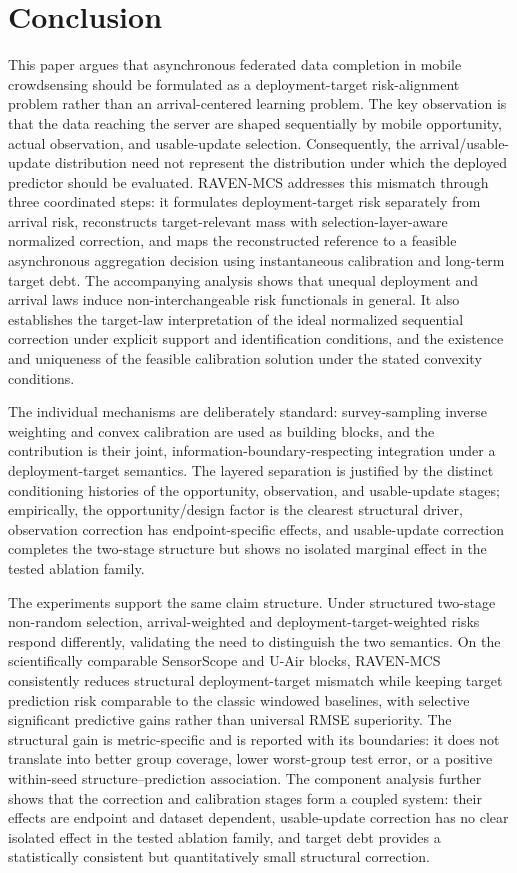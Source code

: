 \documentclass[letterpaper,journal]{IEEEtran}
\begin{document}
\section{Conclusion}
\label{sec:conclusion}

This paper argues that asynchronous federated data completion in mobile
crowdsensing should be formulated as a deployment-target risk-alignment
problem rather than an arrival-centered learning problem.  The key observation
is that the data reaching the server are shaped sequentially by mobile
opportunity, actual observation, and usable-update selection.  Consequently,
the arrival/usable-update distribution need not represent the distribution
under which the deployed predictor should be evaluated.  RAVEN-MCS addresses this
mismatch through three coordinated steps: it formulates deployment-target risk
separately from arrival risk, reconstructs target-relevant mass with
selection-layer-aware normalized correction, and maps the reconstructed
reference to a feasible asynchronous aggregation decision using instantaneous
calibration and long-term target debt.  The accompanying analysis shows that unequal deployment and arrival laws
induce non-interchangeable risk functionals in general.  It also establishes
the target-law interpretation of the ideal normalized sequential correction
under explicit support and identification conditions, and the existence and
uniqueness of the feasible calibration solution under the stated convexity
conditions.

The individual mechanisms are deliberately standard: survey-sampling inverse
weighting and convex calibration are used as building blocks, and the
contribution is their joint, information-boundary-respecting integration under
a deployment-target semantics.  The layered separation is justified by the
distinct conditioning histories of the opportunity, observation, and
usable-update stages; empirically, the opportunity/design factor is the
clearest structural driver, observation correction has endpoint-specific
effects, and usable-update correction completes the two-stage structure but
shows no isolated marginal effect in the tested ablation family.

The experiments support the same claim structure.  Under structured
two-stage non-random selection, arrival-weighted and deployment-target-weighted
risks respond differently, validating the need to distinguish the two
semantics.  On the scientifically comparable SensorScope and U-Air blocks,
RAVEN-MCS consistently reduces structural deployment-target mismatch while
keeping target prediction risk comparable to the classic windowed baselines, with selective significant
predictive gains rather than universal RMSE superiority.  The structural gain is
metric-specific and is reported with its boundaries: it does not translate into
better group coverage, lower worst-group test error, or a positive within-seed
structure--prediction association.  The component
analysis further shows that the correction and calibration stages form a
coupled system: their effects are endpoint and dataset dependent, usable-update
correction has no clear isolated effect in the tested ablation family, and
target debt provides a statistically consistent but quantitatively small
structural correction.
\end{document}
